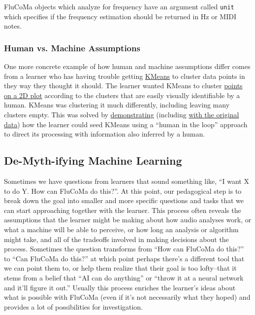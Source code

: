 \documentclass{article}
\begin{document}
FluCoMa objects which analyze for frequency have an argument called \texttt{unit} which specifies if the frequency estimation should be returned in Hz or MIDI notes.

\subsubsection{Human vs. Machine Assumptions}

One more concrete example of how human and machine assumptions differ
comes from a learner who has having trouble getting
\href{https://learn.flucoma.org/reference/kmeans/}{KMeans} to cluster
data points in they way they thought it should. The learner wanted
KMeans to cluster
\href{https://discourse.flucoma.org/uploads/default/original/2X/2/25c1edfb63797e7fd4051872088e6610ce908981.jpeg}{points on a 
2D plot} according to the clusters that are easily visually identifiable
by a human. KMeans was clustering it much differently,
including leaving many clusters empty. This was solved by
\href{https://www.youtube.com/watch?v=LzoWRqZzhZ4}{demonstrating}
(including \href{https://www.youtube.com/watch?v=mFsuJXqNYFs}{with the
original data}) how the learner could seed KMeans using a ``human in the
loop'' approach to direct its processing with information also
inferred by a human.

\subsection{De-Myth-ifying Machine Learning}\label{de-myth-ifying-machine-learning}

Sometimes we have questions from learners that sound something like, ``I
want X to do Y. How can FluCoMa do this?''. At this point, our
pedagogical step is to break down the goal into smaller and more
specific questions and tasks that we can start approaching together with
the learner. This process often reveals the assumptions that the learner
might be making about how audio analyses work, or what a machine will be
able to perceive, or how long an analysis or algorithm might take, and
all of the tradeoffs involved in making decisions about the process.
Sometimes the question transforms from ``How can FluCoMa do this?'' to
``Can FluCoMa do this?'' at which point perhaps there's a different tool
that we can point them to, or help them realize that their goal is too
lofty--that it stems from a belief that ``AI can do anything'' or
``throw it at a neural network and it'll figure it out.'' Usually this
process enriches the learner's ideas about what is possible with FluCoMa
(even if it's not necessarily what they hoped) and provides a lot of
possibilities for investigation.
\end{document}
